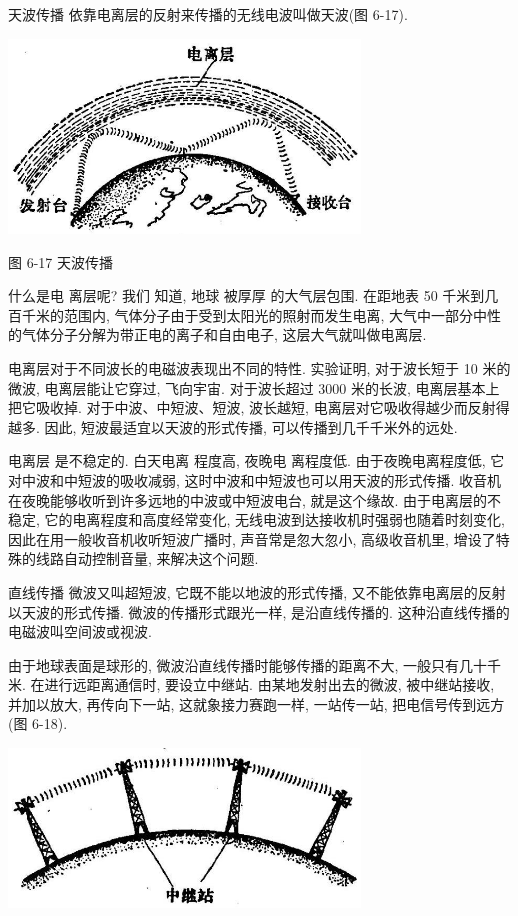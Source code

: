 \documentclass[10pt]{article}
\begin{document}
天波传播 依靠电离层的反射来传播的无线电波叫做天波(图 6-17).

\begin{center}
\includegraphics[max width=0.7\textwidth]{images/01913056-1f15-74d8-9184-9aab52c9d66b_210_923860.jpg}
\end{center}

图 6-17 天波传播

什么是电 离层呢? 我们 知道, 地球 被厚厚 的大气层包围. 在距地表 50 千米到几百千米的范围内, 气体分子由于受到太阳光的照射而发生电离, 大气中一部分中性的气体分子分解为带正电的离子和自由电子, 这层大气就叫做电离层.

电离层对于不同波长的电磁波表现出不同的特性. 实验证明, 对于波长短于 10 米的微波, 电离层能让它穿过, 飞向宇宙. 对于波长超过 3000 米的长波, 电离层基本上把它吸收掉. 对于中波、中短波、短波, 波长越短, 电离层对它吸收得越少而反射得越多. 因此, 短波最适宜以天波的形式传播, 可以传播到几千千米外的远处.

电离层 是不稳定的. 白天电离 程度高, 夜晚电 离程度低. 由于夜晚电离程度低, 它对中波和中短波的吸收减弱, 这时中波和中短波也可以用天波的形式传播. 收音机在夜晚能够收听到许多远地的中波或中短波电台, 就是这个缘故. 由于电离层的不稳定, 它的电离程度和高度经常变化, 无线电波到达接收机时强弱也随着时刻变化, 因此在用一般收音机收听短波广播时, 声音常是忽大忽小, 高级收音机里, 增设了特殊的线路自动控制音量, 来解决这个问题.

直线传播 微波又叫超短波, 它既不能以地波的形式传播, 又不能依靠电离层的反射以天波的形式传播. 微波的传播形式跟光一样, 是沿直线传播的. 这种沿直线传播的电磁波叫空间波或视波.

由于地球表面是球形的, 微波沿直线传播时能够传播的距离不大, 一般只有几十千米. 在进行远距离通信时, 要设立中继站. 由某地发射出去的微波, 被中继站接收, 并加以放大, 再传向下一站, 这就象接力赛跑一样, 一站传一站, 把电信号传到远方(图 6-18).

\begin{center}
\includegraphics[max width=0.7\textwidth]{images/01913056-1f15-74d8-9184-9aab52c9d66b_211_963291.jpg}
\end{center}
\end{document}
